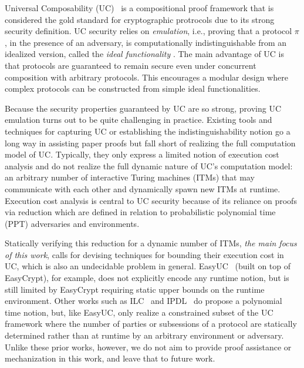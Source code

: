
Universal Composability (UC)~\cite{canettiUC} is a compositional proof framework that is considered the gold
standard for cryptographic protrocols due to its strong security definition.
UC security relies on \emph{emulation}, i.e., proving that a protocol $\pi$, in the presence of an adversary, is
computationally indistinguishable from an idealized version, called the \emph{ideal functionality} \F.
The main advantage of UC is that protocols are guaranteed to remain secure even under concurrent composition
with arbitrary protocols.
This encourages a modular design where complex protocols can be constructed from simple ideal functionalities.

Because the security properties guaranteed by UC are so strong, proving UC emulation turns out to be quite
challenging in practice. Existing tools and techniques for capturing UC or establishing the indistinguishability
notion go a long way in assisting paper proofs but fall short of realizing the full computation model of UC.
Typically, they only express a limited notion of execution cost analysis and do not realize the full dynamic
nature of UC's computation model: an arbitrary number of interactive Turing machines (ITMs) that may communicate
with each other and dynamically spawn new ITMs at runtime.
Execution cost analysis is central to UC security because of its reliance on proofs via reduction which
are defined in relation to probabilistic polynomial time (PPT) adversaries and environments.

Statically verifying this reduction for a dynamic number of ITMs, \emph{the main focus of this work}, calls for
devising techniques for bounding their execution cost in UC, which is also an undecidable problem in general.
EasyUC~\cite{easyuc} (built on top of EasyCrypt), for example, does not explicitly encode any runtime notion,
but is still limited by EasyCrypt requiring static upper bounds on the runtime environment.
Other works such as ILC~\cite{ilc} and IPDL~\cite{ipdl} do propose a polynomial time notion, but, like EasyUC,
only realize a constrained subset of the UC framework where the number of parties or subsessions of a
protocol are statically determined rather than at runtime by an arbitrary environment or adversary.
Unlike these prior works, however, we do not aim to provide proof assistance or mechanization in this work,
and leave that to future work.

